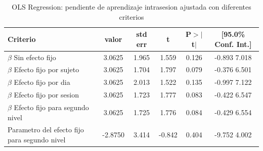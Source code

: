 \documentclass{article}
\begin{document}
\begin{table}

\begin{center}

\caption{OLS Regression: pendiente de aprendizaje intrasesion ajustada con diferentes criterios}
\label{tabla:betasIntrasesion}
\vspace{0.3in}

\begin{tabular}{lccccc}
            Criterio & valor & \textbf{std err} & \textbf{t} & \textbf{P$>|$t$|$} & \textbf{[95.0\% Conf. Int.]}  \\
\midrule
$\beta$ Sin efecto fijo &       3.0625  &       1.965     &     1.559  &         0.126       &        -0.893     7.018       \\
$\beta$ Efecto fijo por sujeto &  3.0625    &  1.704    &  1.797    &  0.079    &    -0.376     6.501\\
$\beta$ Efecto fijo por dia &     3.0625    &  2.013    &  1.522    &  0.135    &    -0.997     7.122\\
$\beta$ Efecto fijo por sesion &    3.0625  &    1.723  &    1.777  &    0.083  &      -0.422     6.547 \\
$\beta$ Efecto fijo para segundo nivel & 3.0625 &     1.725 &     1.776 &     0.084     &   -0.429     6.554 \\
Parametro del efecto fijo para segundo nivel & -2.8750    &  3.414 &     -0.842 &     0.404   &     -9.752     4.002 \\
\bottomrule
\end{tabular}

\end{center}

\end{table}
\end{document}
